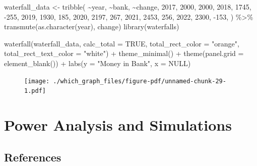 \documentclass[
  letterpaper,
]{book}
\newenvironment{Shaded}{\begin{snugshade}}{\end{snugshade}}
\newcommand{\AttributeTok}[1]{\textcolor[rgb]{0.40,0.45,0.13}{#1}}
\newcommand{\ConstantTok}[1]{\textcolor[rgb]{0.56,0.35,0.01}{#1}}
\newcommand{\DecValTok}[1]{\textcolor[rgb]{0.68,0.00,0.00}{#1}}
\newcommand{\FunctionTok}[1]{\textcolor[rgb]{0.28,0.35,0.67}{#1}}
\newcommand{\NormalTok}[1]{\textcolor[rgb]{0.00,0.23,0.31}{#1}}
\newcommand{\OtherTok}[1]{\textcolor[rgb]{0.00,0.23,0.31}{#1}}
\newcommand{\SpecialCharTok}[1]{\textcolor[rgb]{0.37,0.37,0.37}{#1}}
\newcommand{\StringTok}[1]{\textcolor[rgb]{0.13,0.47,0.30}{#1}}
\begin{document}
\begin{Shaded}
\begin{Highlighting}[]
\NormalTok{waterfall\_data }\OtherTok{\textless{}{-}} \FunctionTok{tribble}\NormalTok{(}
  \SpecialCharTok{\textasciitilde{}}\NormalTok{year, }\SpecialCharTok{\textasciitilde{}}\NormalTok{bank, }\SpecialCharTok{\textasciitilde{}}\NormalTok{change,}
  \DecValTok{2017}\NormalTok{, }\DecValTok{2000}\NormalTok{, }\DecValTok{2000}\NormalTok{,}
  \DecValTok{2018}\NormalTok{, }\DecValTok{1745}\NormalTok{, }\SpecialCharTok{{-}}\DecValTok{255}\NormalTok{,}
  \DecValTok{2019}\NormalTok{, }\DecValTok{1930}\NormalTok{, }\DecValTok{185}\NormalTok{,}
  \DecValTok{2020}\NormalTok{, }\DecValTok{2197}\NormalTok{, }\DecValTok{267}\NormalTok{,}
  \DecValTok{2021}\NormalTok{, }\DecValTok{2453}\NormalTok{, }\DecValTok{256}\NormalTok{,  }
  \DecValTok{2022}\NormalTok{, }\DecValTok{2300}\NormalTok{, }\SpecialCharTok{{-}}\DecValTok{153}\NormalTok{,}
\NormalTok{) }\SpecialCharTok{\%\textgreater{}\%} \FunctionTok{transmute}\NormalTok{(}\FunctionTok{as.character}\NormalTok{(year), change)}
\FunctionTok{library}\NormalTok{(waterfalls)}


\FunctionTok{waterfall}\NormalTok{(waterfall\_data,  }\AttributeTok{calc\_total =} \ConstantTok{TRUE}\NormalTok{,}
          \AttributeTok{total\_rect\_color =} \StringTok{"orange"}\NormalTok{,}
          \AttributeTok{total\_rect\_text\_color =} \StringTok{"white"}\NormalTok{) }\SpecialCharTok{+} 
  \FunctionTok{theme\_minimal}\NormalTok{() }\SpecialCharTok{+}
  \FunctionTok{theme}\NormalTok{(}\AttributeTok{panel.grid =} \FunctionTok{element\_blank}\NormalTok{()) }\SpecialCharTok{+}
  \FunctionTok{labs}\NormalTok{(}\AttributeTok{y =} \StringTok{"Money in Bank"}\NormalTok{, }\AttributeTok{x =} \ConstantTok{NULL}\NormalTok{)}
\end{Highlighting}
\end{Shaded}

\begin{figure}[H]

{\centering \texttt{[image: ./which\_graph\_files/figure-pdf/unnamed-chunk-29-1.pdf]}

}

\end{figure}

\part{Power Analysis and Simulations}


\hypertarget{references}{%
\chapter*{References}\label{references}}




\backmatter
\end{document}
